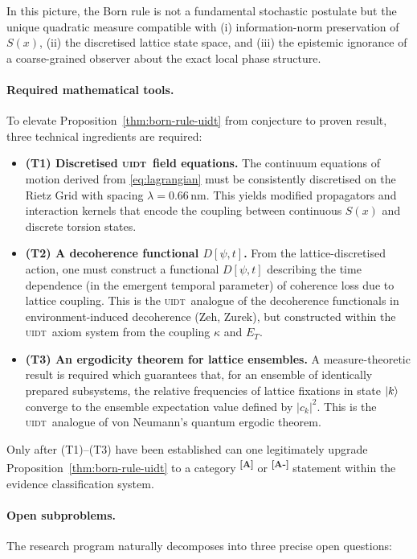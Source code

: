\documentclass[12pt,a4paper,twoside]{article}
\theoremstyle{plain}
\theoremstyle{definition}
\theoremstyle{remark}
\newcommand{\UIDT}{\textsc{uidt}}
\newcommand{\catmark}[1]{\textsuperscript{\textsf{\textbf{[#1]}}}}
\begin{document}
In this picture, the Born rule is not a fundamental stochastic postulate but
the unique quadratic measure compatible with (i) information-norm preservation
of $S(x)$, (ii) the discretised lattice state space, and (iii) the epistemic
ignorance of a coarse-grained observer about the exact local phase structure.

\paragraph{Required mathematical tools.}
To elevate Proposition~\ref{thm:born-rule-uidt} from conjecture to proven result,
three technical ingredients are required:

\begin{itemize}
  \item \textbf{(T1) Discretised \UIDT\ field equations.}
  The continuum equations of motion derived from \eqref{eq:lagrangian} must be
  consistently discretised on the Rietz Grid with spacing
  $\lambda = 0.66\,\mathrm{nm}$. This yields modified propagators and
  interaction kernels that encode the coupling between continuous $S(x)$ and
  discrete torsion states.

  \item \textbf{(T2) A decoherence functional $D[\psi,t]$.}
  From the lattice-discretised action, one must construct a functional
  $D[\psi,t]$ describing the time dependence (in the emergent temporal
  parameter) of coherence loss due to lattice coupling. This is the
  \UIDT\ analogue of the decoherence functionals in environment-induced
  decoherence (Zeh, Zurek), but constructed within the \UIDT\ axiom system
  from the coupling $\kappa$ and $E_T$.

  \item \textbf{(T3) An ergodicity theorem for lattice ensembles.}
  A measure-theoretic result is required which guarantees that, for an
  ensemble of identically prepared subsystems, the relative frequencies of
  lattice fixations in state $\ket{k}$ converge to the ensemble expectation
  value defined by $|c_k|^2$. This is the \UIDT\ analogue of von Neumann's
  quantum ergodic theorem.
\end{itemize}

Only after (T1)--(T3) have been established can one legitimately upgrade
Proposition~\ref{thm:born-rule-uidt} to a category \catmark{A} or \catmark{A-}
statement within the evidence classification system.
\clearpage
\paragraph{Open subproblems.}
The research program naturally decomposes into three precise open questions:
\end{document}
